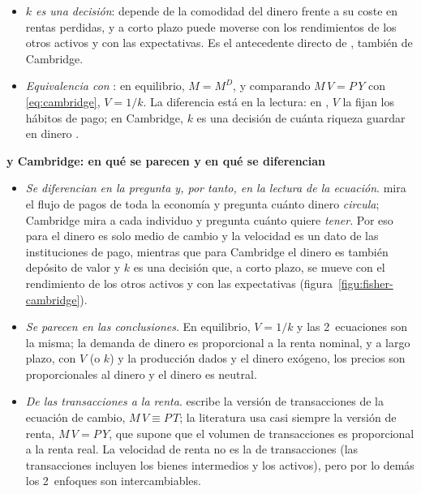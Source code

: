 \documentclass[11pt]{article}
\begin{document}
\begin{itemize}
\begin{itemize}
  \item \emph{$k$ es una decisión}: depende de la comodidad del dinero frente a su coste en rentas perdidas, y a corto plazo puede moverse con los rendimientos de los otros activos y con las expectativas\nocite{Serletis2007Demand}. Es el antecedente directo de , también de Cambridge.
  \item \emph{Equivalencia con }: en equilibrio, $M=M^D$, y comparando $M\,V=P\,Y$ con \eqref{eq:cambridge}, $V=1/k$. La diferencia está en la lectura: en , $V$ la fijan los hábitos de pago; en Cambridge, $k$ es una decisión de cuánta riqueza guardar en dinero .
  \end{itemize}
\end{itemize}

\begin{anotaciones}
\textbf{ y Cambridge: en qué se parecen y en qué se diferencian}
\begin{itemize}
\item \emph{Se diferencian en la pregunta y, por tanto, en la lectura de la ecuación}.  mira el flujo de pagos de toda la economía y pregunta cuánto dinero \emph{circula}; Cambridge mira a cada individuo y pregunta cuánto quiere \emph{tener}. Por eso para  el dinero es solo medio de cambio y la velocidad es un dato de las instituciones de pago, mientras que para Cambridge el dinero es también depósito de valor y $k$ es una decisión que, a corto plazo, se mueve con el rendimiento de los otros activos y con las expectativas (figura~\ref{figu:fisher-cambridge}).
\item \emph{Se parecen en las conclusiones}. En equilibrio, $V=1/k$ y las 2~ecuaciones son la misma; la demanda de dinero es proporcional a la renta nominal, y a largo plazo, con $V$ (o $k$) y la producción dados y el dinero exógeno, los precios son proporcionales al dinero y el dinero es neutral.
\item \emph{De las transacciones a la renta}.  escribe la versión de transacciones de la ecuación de cambio, $M\,V\equiv P\,T$; la literatura usa casi siempre la versión de renta, $M\,V=P\,Y$, que supone que el volumen de transacciones es proporcional a la renta real. La velocidad de renta no es la de transacciones (las transacciones incluyen los bienes intermedios y los activos), pero por lo demás los 2~enfoques son intercambiables\nocite{Serletis2007Demand}.
\end{itemize}
\begin{infografiacaja}
\caption{La teoría cuantitativa: el enfoque de  frente al de Cambridge}\label{figu:fisher-cambridge}
\end{infografiacaja}
\end{anotaciones}
\end{document}
